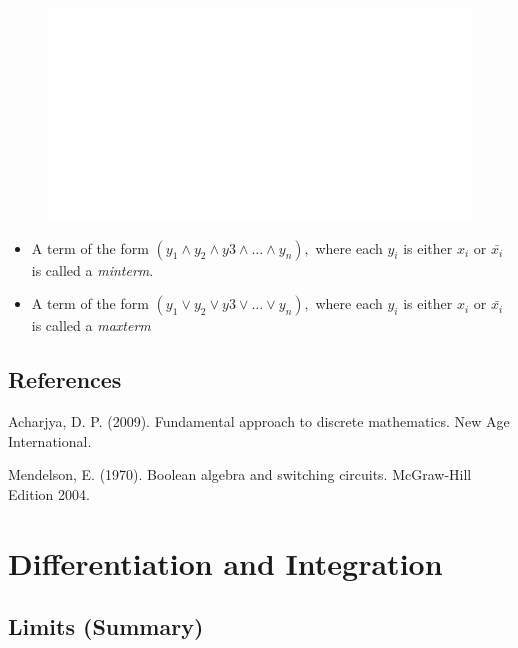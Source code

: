 \documentclass[]{book}
\providecommand{\tightlist}{%
  \setlength{\itemsep}{0pt}\setlength{\parskip}{0pt}}
\begin{document}
\begin{figure}

{\centering \includegraphics[width=1\linewidth]{figure/boxC417-1} 

}

\end{figure}

\begin{itemize}
\tightlist
\item
  A term of the form \((y_1\land y_2 \land y3 \land \dots \land y_n),\) where each \(y_i\) is either \(x_i\) or \(\bar{x_i}\) is called a \emph{minterm}.
\item
  A term of the form \((y_1 \lor y_2 \lor y3 \lor \dots \lor y_n),\) where each \(y_i\) is either \(x_i\) or \(\bar{x_i}\) is called a \emph{maxterm}
\end{itemize}

\hypertarget{references-2}{%
\section*{References}\label{references-2}}

Acharjya, D. P. (2009). Fundamental approach to discrete mathematics. New Age International.

Mendelson, E. (1970). Boolean algebra and switching circuits. McGraw-Hill Edition 2004.

\hypertarget{differentiation-and-integration}{%
\chapter{Differentiation and Integration}\label{differentiation-and-integration}}


\hypertarget{limits-summary}{%
\section*{Limits (Summary)}\label{limits-summary}}
\end{document}
